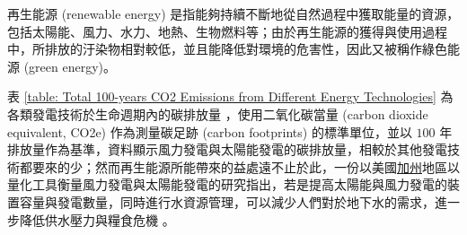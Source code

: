 再生能源 (renewable energy) 是指能夠持續不斷地從自然過程中獲取能量的資源，包括太陽能、風力、水力、地熱、生物燃料等；由於再生能源的獲得與使用過程中，所排放的汙染物相對較低，並且能降低對環境的危害性，因此又被稱作綠色能源 (green energy)。

表 \ref{table: Total 100-years CO2 Emissions from Different Energy Technologies} 為各類發電技術於生命週期內的碳排放量 \cite{jacobson2009review}，使用二氧化碳當量 (carbon dioxide equivalent, CO2e) 作為測量碳足跡 (carbon footprints) 的標準單位，並以 $100$ 年排放量作為基準，資料顯示風力發電與太陽能發電的碳排放量，相較於其他發電技術都要來的少；然而再生能源所能帶來的益處遠不止於此，一份以美國\uline{加州}地區以量化工具衡量風力發電與太陽能發電的研究指出，若是提高太陽能與風力發電的裝置容量與發電數量，同時進行水資源管理，可以減少人們對於地下水的需求，進一步降低供水壓力與糧食危機 \cite{He2019}。

